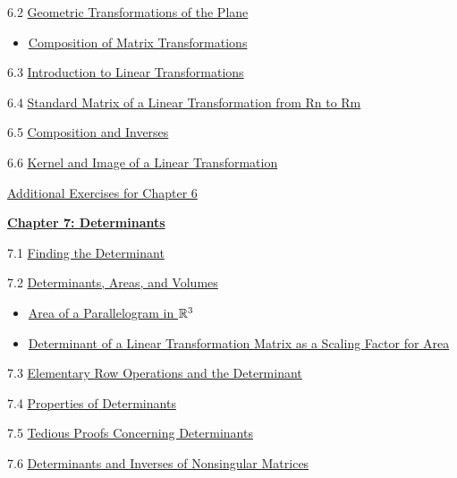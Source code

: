 \documentclass{ximera}
\begin{document}
6.2	\href{https://ximera.osu.edu/oerlinalg/LinearAlgebra/LTR-0070/main}{Geometric Transformations of the Plane}
\begin{itemize}
    \item 
    \href{https://www.geogebra.org/m/d6jyt85s}{Composition of Matrix Transformations}
\end{itemize}
	
6.3	\href{https://ximera.osu.edu/oerlinalg/LinearAlgebra/LTR-0010/main}{Introduction to Linear Transformations}
	
6.4	\href{https://ximera.osu.edu/oerlinalg/LinearAlgebra/LTR-0020/main}{Standard Matrix of a Linear Transformation from Rn to Rm}
	
6.5	\href{https://ximera.osu.edu/oerlinalg/LinearAlgebra/LTR-0030/main}{Composition and Inverses}
	
6.6	\href{https://ximera.osu.edu/oerlinalg/LinearAlgebra/LTR-0050/main}{Kernel and Image of a Linear Transformation}
	
\href{https://ximera.osu.edu/oerlinalg/LinearAlgebra/SUPX-0060/main}{Additional Exercises for Chapter 6}
	
\href{https://ximera.osu.edu/oerlinalg/LinearAlgebra/XLAChapter_det/main}{\textbf{Chapter 7: Determinants}}
	
7.1	\href{https://ximera.osu.edu/oerlinalg/LinearAlgebra/DET-0010/main}{Finding the Determinant}
	
7.2	\href{https://ximera.osu.edu/oerlinalg/LinearAlgebra/DET-0070/main}{Determinants, Areas, and Volumes}
\begin{itemize}
    \item 
    \href{https://www.geogebra.org/m/g7g6kjqm}{Area of a Parallelogram in $\mathbb{R}^3$}
    \item
    \href{https://www.geogebra.org/m/nr8jsz4w}{Determinant of a Linear Transformation Matrix as a Scaling Factor for Area}
\end{itemize}
	
7.3	\href{https://ximera.osu.edu/oerlinalg/LinearAlgebra/DET-0030/main}{Elementary Row Operations and the Determinant}
	
7.4	\href{https://ximera.osu.edu/oerlinalg/LinearAlgebra/DET-0040/main}{Properties of Determinants}
	
7.5	\href{https://ximera.osu.edu/oerlinalg/LinearAlgebra/DET-0050/main}{Tedious Proofs Concerning Determinants}
	
7.6	\href{https://ximera.osu.edu/oerlinalg/LinearAlgebra/DET-0060/main}{Determinants and Inverses of Nonsingular Matrices}
	
\end{document}
